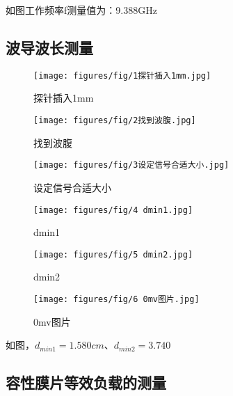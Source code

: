 \documentclass[12pt,hyperref,a4paper,UTF8]{ctexart}
\begin{document}
如图工作频率f测量值为：9.388GHz


\subsection{波导波长测量}

\begin{figure}[H]
    \centering
    \begin{minipage}{.33\textwidth}
        \centering
        \texttt{[image: figures/fig/1探针插入1mm.jpg]}
        \caption{探针插入1mm}
        \label{fig:probe-insertion}
    \end{minipage}%
    \begin{minipage}{.33\textwidth}
        \centering
        \texttt{[image: figures/fig/2找到波腹.jpg]}
        \caption{找到波腹}
        \label{fig:find-belly}
    \end{minipage}%
    \begin{minipage}{.33\textwidth}
        \centering
        \texttt{[image: figures/fig/3设定信号合适大小.jpg]}
        \caption{设定信号合适大小}
        \label{fig:set-signal-size}
    \end{minipage}
\end{figure}


\begin{figure}[H]
    \centering
    \begin{minipage}{.33\textwidth}
        \centering
        \texttt{[image: figures/fig/4 dmin1.jpg]}
        \caption{dmin1}
        \label{fig:dmin1}
    \end{minipage}%
    \begin{minipage}{.33\textwidth}
        \centering
        \texttt{[image: figures/fig/5 dmin2.jpg]}
        \caption{dmin2}
        \label{fig:dmin2}
    \end{minipage}%
    \begin{minipage}{.33\textwidth}
        \centering
        \texttt{[image: figures/fig/6 0mv图片.jpg]}
        \caption{0mv图片}
        \label{fig:0mv-image}
    \end{minipage}
\end{figure}

如图，$d_{min1}=1.580cm$、$d_{min2}=3.740$


\subsection{容性膜片等效负载的测量}
\end{document}
